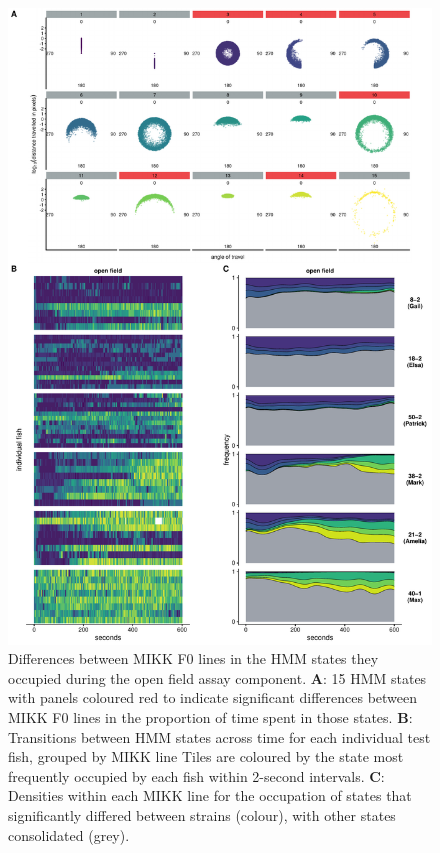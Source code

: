 \documentclass[
]{book}
\begin{document}
\begin{figure}
\includegraphics[width=1\linewidth]{figs/mikk_behaviour/select_0.08_15_dge_of} \caption{Differences between MIKK F0 lines in the HMM states they occupied during the open field assay component. \textbf{A}: 15 HMM states with panels coloured red to indicate significant differences between MIKK F0 lines in the proportion of time spent in those states. \textbf{B}: Transitions between HMM states across time for each individual test fish, grouped by MIKK line Tiles are coloured by the state most frequently occupied by each fish within 2-second intervals. \textbf{C}: Densities within each MIKK line for the occupation of states that significantly differed between strains (colour), with other states consolidated (grey).}\label{fig:F2-time-dge-of}
\end{figure}
\end{document}
